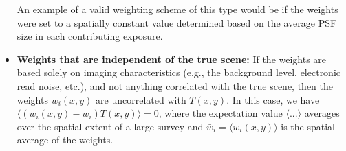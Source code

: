 \documentclass{openjournal}
\newcommand{\irresponse}[1]{{#1}}
\begin{document}
\begin{itemize}
    \irresponse{An example of a valid weighting scheme of this type would be if the weights were set to a spatially constant value determined based on the average PSF size in each contributing exposure.}
    
    \item \textbf{Weights that are independent of the true scene:}  If the weights are based solely on imaging characteristics (e.g., the background level, electronic read noise, etc.), and not anything correlated with the true scene, then the weights $w_i(x,y)$ are uncorrelated with $T(x,y)$.
    In this case, we have $\langle (w_i(x,y)-\bar w_i) T(x,y) \rangle = 0$, where \irresponse{the expectation value $\langle ...\rangle$ averages over the spatial extent of a large survey and} $\bar{w}_i = \langle w_i(x,y)\rangle$ is the spatial average of the weights.  
    

\end{itemize}
\end{document}
